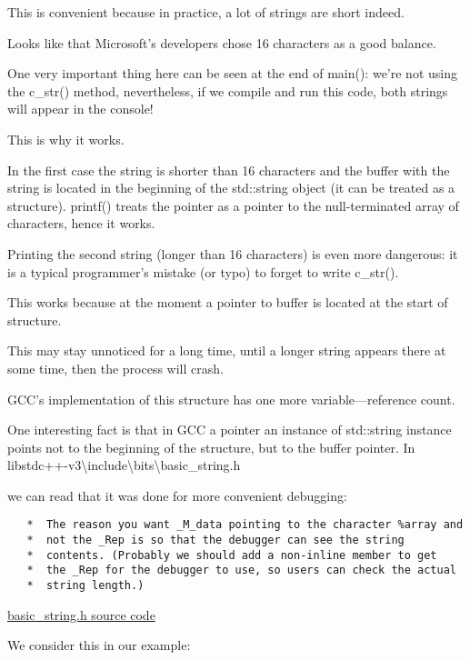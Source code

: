 This is convenient because
in practice, a lot of strings are short indeed.

Looks like that Microsoft's developers chose 16 characters as a good balance.

One very important thing here can be seen at the end of main(): we're not using the c\_str() method, nevertheless,
if we compile and run this code, both strings will appear in the console!

This is why it works.

In the first case the string is shorter than 16 characters and the buffer with the string is located in the
beginning of the std::string object (it can be treated as a structure).
printf() treats the pointer as a pointer to the null-terminated 
array of characters, hence it works.

Printing the second string (longer than 16 characters) is even more dangerous: it is a typical programmer's mistake
(or typo) to forget to write c\_str().

This works because at the moment a pointer to buffer is located at the start of structure.

This may stay unnoticed for a long time, until a longer string appears there at some time, 
then the process will crash.


GCC's implementation of this structure has one more variable---reference count.

One interesting fact is that in GCC a pointer an instance of std::string instance points not to
the beginning of the structure, but to the buffer pointer.
In libstdc++-v3\textbackslash{}include\textbackslash{}bits\textbackslash{}basic\_string.h 

we can read that it was done for more convenient debugging:

\begin{lstlisting}
   *  The reason you want _M_data pointing to the character %array and
   *  not the _Rep is so that the debugger can see the string
   *  contents. (Probably we should add a non-inline member to get
   *  the _Rep for the debugger to use, so users can check the actual
   *  string length.)
\end{lstlisting}

\href{http://go.yurichev.com/17085}{basic\_string.h source code}

We consider this in our example:



